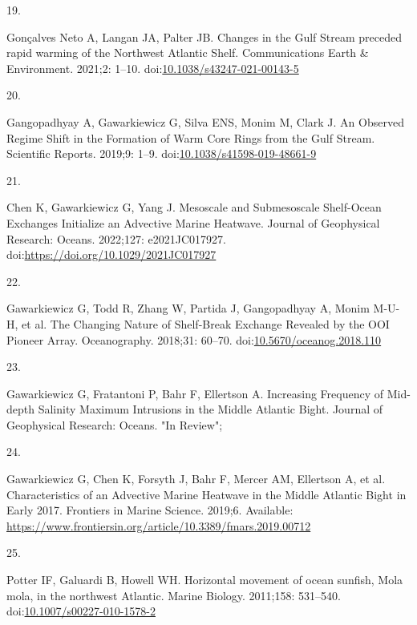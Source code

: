 \documentclass[
  10pt,
]{article}
\newlength{\cslhangindent}
\newlength{\csllabelwidth}
\newlength{\cslentryspacingunit} %
\newenvironment{CSLReferences}[2] %
 {%
  \setlength{\parindent}{0pt}
  \ifodd #1
  \let\oldpar\par
  \def\par{\hangindent=\cslhangindent\oldpar}
  \fi
  \setlength{\parskip}{#2\cslentryspacingunit}
 }%
 {}
\newcommand{\CSLLeftMargin}[1]{\parbox[t]{\csllabelwidth}{#1}}
\newcommand{\CSLRightInline}[1]{\parbox[t]{\linewidth - \csllabelwidth}{#1}\break}
\begin{document}
\begin{CSLReferences}{0}{0}
\leavevmode{}%
\CSLLeftMargin{19. }%
\CSLRightInline{Gonçalves Neto A, Langan JA, Palter JB. Changes in the {Gulf} {Stream} preceded rapid warming of the {Northwest} {Atlantic} {Shelf}. Communications Earth \& Environment. 2021;2: 1--10. doi:\href{https://doi.org/10.1038/s43247-021-00143-5}{10.1038/s43247-021-00143-5}}

\leavevmode{}%
\CSLLeftMargin{20. }%
\CSLRightInline{Gangopadhyay A, Gawarkiewicz G, Silva ENS, Monim M, Clark J. An {Observed} {Regime} {Shift} in the {Formation} of {Warm} {Core} {Rings} from the {Gulf} {Stream}. Scientific Reports. 2019;9: 1--9. doi:\href{https://doi.org/10.1038/s41598-019-48661-9}{10.1038/s41598-019-48661-9}}

\leavevmode{}%
\CSLLeftMargin{21. }%
\CSLRightInline{Chen K, Gawarkiewicz G, Yang J. Mesoscale and {Submesoscale} {Shelf}-{Ocean} {Exchanges} {Initialize} an {Advective} {Marine} {Heatwave}. Journal of Geophysical Research: Oceans. 2022;127: e2021JC017927. doi:\url{https://doi.org/10.1029/2021JC017927}}

\leavevmode{}%
\CSLLeftMargin{22. }%
\CSLRightInline{Gawarkiewicz G, Todd R, Zhang W, Partida J, Gangopadhyay A, Monim M-U-H, et al. The {Changing} {Nature} of {Shelf}-{Break} {Exchange} {Revealed} by the {OOI} {Pioneer} {Array}. Oceanography. 2018;31: 60--70. doi:\href{https://doi.org/10.5670/oceanog.2018.110}{10.5670/oceanog.2018.110}}

\leavevmode{}%
\CSLLeftMargin{23. }%
\CSLRightInline{Gawarkiewicz G, Fratantoni P, Bahr F, Ellertson A. Increasing {Frequency} of {Mid}-depth {Salinity} {Maximum} {Intrusions} in the {Middle} {Atlantic} {Bight}. Journal of Geophysical Research: Oceans. "In Review"; }

\leavevmode{}%
\CSLLeftMargin{24. }%
\CSLRightInline{Gawarkiewicz G, Chen K, Forsyth J, Bahr F, Mercer AM, Ellertson A, et al. Characteristics of an {Advective} {Marine} {Heatwave} in the {Middle} {Atlantic} {Bight} in {Early} 2017. Frontiers in Marine Science. 2019;6. Available: \url{https://www.frontiersin.org/article/10.3389/fmars.2019.00712}}

\leavevmode{}%
\CSLLeftMargin{25. }%
\CSLRightInline{Potter IF, Galuardi B, Howell WH. Horizontal movement of ocean sunfish, {Mola} mola, in the northwest {Atlantic}. Marine Biology. 2011;158: 531--540. doi:\href{https://doi.org/10.1007/s00227-010-1578-2}{10.1007/s00227-010-1578-2}}


\end{CSLReferences}
\end{document}
